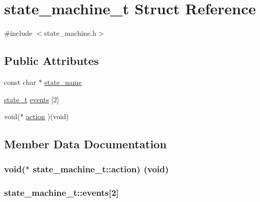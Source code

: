 \hypertarget{structstate__machine__t}{}\section{state\+\_\+machine\+\_\+t Struct Reference}
\label{structstate__machine__t}


{\ttfamily \#include $<$state\+\_\+machine.\+h$>$}

\subsection*{Public Attributes}
\begin{DoxyCompactItemize}
\item 
const char $\ast$ \hyperlink{structstate__machine__t_a80c4c7668792fd3918487aa242693800}{state\+\_\+name}
\item 
\hyperlink{state__machine_8h_aa7e27c2c7466e74443d5b84380bdd4c0}{state\+\_\+t} \hyperlink{structstate__machine__t_a1f0a3c030f3de5e87d1e005459bf382b}{events} \mbox{[}2\mbox{]}
\item 
void($\ast$ \hyperlink{structstate__machine__t_a247de2b04589105eb3f9d4887e817896}{action} )(void)
\end{DoxyCompactItemize}


\subsection{Member Data Documentation}
\subsubsection[{\texorpdfstring{action}{action}}]{\setlength{\rightskip}{0pt plus 5cm}void($\ast$ state\+\_\+machine\+\_\+t\+::action) (void)}\hypertarget{structstate__machine__t_a247de2b04589105eb3f9d4887e817896}{}\label{structstate__machine__t_a247de2b04589105eb3f9d4887e817896}
\subsubsection[{\texorpdfstring{events}{events}}]{ state\+\_\+machine\+\_\+t\+::events\mbox{[}2\mbox{]}}\hypertarget{structstate__machine__t_a1f0a3c030f3de5e87d1e005459bf382b}{}\label{structstate__machine__t_a1f0a3c030f3de5e87d1e005459bf382b}
